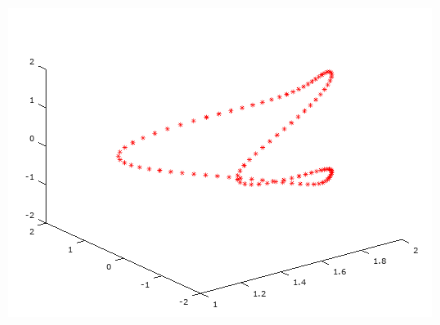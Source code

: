 \documentclass[12pt]{article}
\begin{document}
\begin{minipage}{\textwidth}
\begin{figure}[H]
    	\includegraphics[scale=0.5]{primer8_4} 
    \end{figure} 
    \end{minipage}
\newpage
\end{document}
